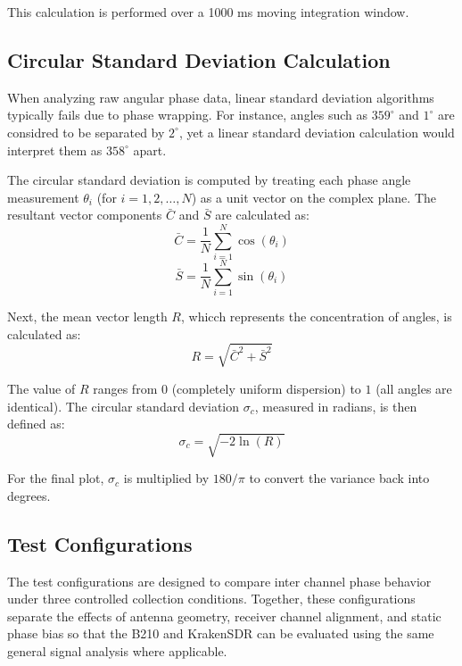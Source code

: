 \documentclass[conference]{IEEEtran}
\begin{document}
This calculation is performed over a 1000 ms moving integration window.

\subsection{Circular Standard Deviation Calculation}
When analyzing raw angular phase data, linear standard deviation algorithms typically fails due to phase wrapping. For instance, angles such as $359^\circ$ and $1^\circ$ are considred to be separated by $2^\circ$, yet a linear standard deviation calculation would interpret them as $358^\circ$ apart.

The circular standard deviation is computed by treating each phase angle measurement $\theta_i$ (for $i=1,2,\dots,N$) as a unit vector on the complex plane. The resultant vector components $\bar{C}$ and $\bar{S}$ are calculated as:
\begin{equation}
\bar{C}=\frac{1}{N}\sum_{i=1}^{N}\cos(\theta_i)
\end{equation}
\begin{equation}
\bar{S}=\frac{1}{N}\sum_{i=1}^{N}\sin(\theta_i)
\end{equation}

Next, the mean vector length $R$, whicch represents the concentration of angles, is calculated as:
\begin{equation}
R=\sqrt{\bar{C}^2+\bar{S}^2}
\end{equation}

The value of $R$ ranges from $0$ (completely uniform dispersion) to $1$ (all angles are identical). The circular standard deviation $\sigma_c$, measured in radians, is then defined as:
\begin{equation}
\sigma_c=\sqrt{-2\ln(R)}
\end{equation}

For the final plot, $\sigma_c$ is multiplied by $180/\pi$ to convert the variance back into degrees.

\subsection{Test Configurations}
The test configurations are designed to compare inter channel phase behavior under three controlled collection conditions. Together, these configurations separate the effects of antenna geometry, receiver channel alignment, and static phase bias so that the B210 and KrakenSDR can be evaluated using the same general signal analysis where applicable.
\end{document}
